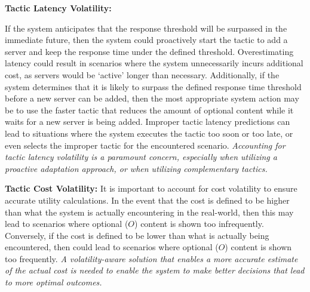 \vspace{1mm} \noindent \textbf{Tactic Latency Volatility: }{If the system anticipates that the response threshold will be surpassed in the immediate future, then the system could proactively start the tactic to add a server and keep the response time under the defined threshold. Overestimating latency could result in scenarios where the system unnecessarily incurs additional cost, as servers would be `active' longer than necessary. Additionally, if the system determines that it is likely to surpass the defined response time threshold before a new server can be added, then the most appropriate system action may be to use the faster tactic that reduces the amount of optional content while it waits for a new server is being added. Improper tactic latency predictions can lead to situations where the system executes the tactic too soon or too late, or even selects the improper tactic for the encountered scenario. \emph{Accounting for tactic latency volatility is a paramount concern, especially when utilizing a proactive adaptation approach, or when utilizing complementary tactics.}




\vspace{1mm} \noindent \textbf{Tactic Cost Volatility:} It is important to account for cost volatility to ensure accurate utility calculations. In the event that the cost is defined to be higher than what the system is actually encountering in the real-world, then this may lead to scenarios where optional ($O$) content is shown too infrequently. Conversely, if the cost is defined to be lower than what is actually being encountered, then could lead to scenarios where optional ($O$) content is shown too frequently. \emph{A volatility-aware solution that enables a more accurate estimate of the actual cost is needed to enable the system to make better decisions that lead to more optimal outcomes.}

}
